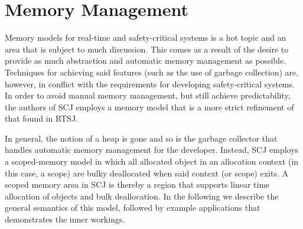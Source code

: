 \section{Memory Management}
\label{section:memoryManagement}
Memory models for real-time and safety-critical systems is a hot topic and an area that is subject to much discussion. This comes as a result of the desire to provide as much abstraction and automatic memory management as possible. Techniques for achieving said features (such as the use of garbage collection) are, however, in conflict with the requirements for developing safety-critical systems. In order to avoid manual memory management, but still achieve predictability, the authors of SCJ employs a memory model that is a more strict refinement of that found in RTSJ.

In general, the notion of a heap is gone and so is the garbage collector that handles automatic memory management for the developer. Instead, SCJ employs a scoped-memory model in which all allocated object in an allocation context (in this case, a scope) are bulky deallocated when said context (or scope) exits. A scoped memory area in SCJ is thereby a region that supports linear time allocation of objects and bulk deallocation\cite{Schoeberl:2007:GCS:1288940.1288953}. In the following we describe the general semantics of this model, followed by example applications that demonstrates the inner workings.


